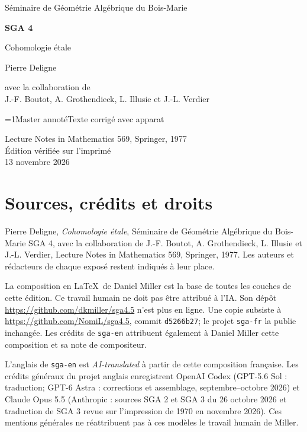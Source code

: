 \documentclass[oneside]{book}
\theoremstyle{sga-source}
\theoremstyle{sga-source-dash}
\theoremstyle{sga-source-dotdash}
\theoremstyle{sga-source-number-note-dash}
\theoremstyle{sga-source-note-number-dotdash}
\theoremstyle{sga-source-example-dotdash}
\theoremstyle{sga-source-inline-number}
\theoremstyle{sga-source-bare-number}
\theoremstyle{sga-source}
\providecommand\EditionIsMaster{0}
\begin{document}
\begin{titlepage}
\centering
\vspace*{2cm}
{\Large Séminaire de Géométrie Algébrique du Bois-Marie\par}
\vspace{0.7cm}
{\Huge\bfseries SGA 4\textonehalf\par}
\vspace{0.8cm}
{\huge Cohomologie étale\par}
\vspace{1cm}
{\Large Pierre Deligne\par}
\vspace{0.5cm}
avec la collaboration de\\[0.3em]
J.-F. Boutot, A. Grothendieck, L. Illusie et J.-L. Verdier
\vfill
{\Large \ifnum\EditionIsMaster=1\relax Master annoté\else Texte corrigé avec apparat\fi\par}
\vspace{0.7cm}
Lecture Notes in Mathematics 569, Springer, 1977\\[0.4em]
Édition vérifiée sur l’imprimé\\
13 novembre 2026
\end{titlepage}

\chapter*{Sources, crédits et droits}
Pierre Deligne, \emph{Cohomologie étale}, Séminaire de Géométrie Algébrique
du Bois-Marie SGA 4\textonehalf, avec la collaboration de J.-F. Boutot,
A. Grothendieck, L. Illusie et J.-L. Verdier, Lecture Notes in Mathematics
569, Springer, 1977. Les auteurs et rédacteurs de chaque exposé restent
indiqués à leur place.

\medskip
La composition en \LaTeX\ de Daniel Miller est la base de toutes les couches
de cette édition. Ce travail humain ne doit pas être attribué à l’IA.
Son dépôt \url{https://github.com/dkmiller/sga4.5} n’est plus en ligne.
Une copie subsiste à \url{https://github.com/NomiL/sga4.5}, commit
\texttt{d5266b27}; le projet \texttt{sga-fr} la publie inchangée.
Les crédits de \texttt{sga-en} attribuent également à Daniel Miller cette
composition et sa note de compositeur.

\medskip
L’anglais de \texttt{sga-en} est \emph{AI-translated} à partir de cette
composition française. Les crédits généraux du projet anglais enregistrent
OpenAI Codex (GPT-5.6 Sol : traduction; GPT-6 Astra : corrections et
assemblage, septembre--octobre 2026) et Claude Opus 5.5 (Anthropic : sources
SGA 2 et SGA 3 du 26 octobre 2026 et traduction de SGA 3 revue sur
l’impression de 1970 en novembre 2026). Ces mentions générales ne
réattribuent pas à ces modèles le travail humain de Miller.
\end{document}
